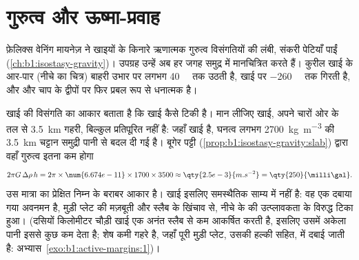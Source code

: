 \section{गुरुत्व और ऊष्मा-प्रवाह}\label{sec:b1:active-margins:gravity-heat}

फ़ेलिक्स वेनिंग मायनेज़ ने खाइयों के किनारे ऋणात्मक गुरुत्व विसंगतियों की लंबी, संकरी पेटियाँ पाईं (\cref{ch:b1:isostasy-gravity})। उपग्रह उन्हें अब हर जगह समुद्र में मानचित्रित करते हैं। कुरील खाई के आर-पार (नीचे का चित्र)  बाहरी उभार पर लगभग \qty{40}{\milli\gal} तक उठती है, खाई पर \qty{-260}{\milli\gal} तक गिरती है, और  और चाप के द्वीपों पर फिर प्रबल रूप से धनात्मक है।

खाई की विसंगति का आकार बताता है कि खाई कैसे टिकी है। मान लीजिए खाई, अपने चारों ओर के तल से \qty{3.5}{km} गहरी, बिल्कुल प्रतिपूरित नहीं है: जहाँ खाई है, घनत्व लगभग \qty{2700}{kg.m^{-3}} की \qty{3.5}{km} चट्टान समुद्री पानी से बदल दी गई है। बूगेर पट्टी (\cref{prop:b1:isostasy-gravity:slab}) द्वारा वहाँ गुरुत्व इतना कम होगा
\[
  2\pi G\,\Delta\rho\,h = 2\pi \times \num{6.674e-11} \times 1700 \times 3500
  \approx \qty{2.5e-3}{m.s^{-2}} = \qty{250}{\milli\gal} .
\]
उस मात्रा का प्रेक्षित निम्न के बराबर आकार है। खाई इसलिए समस्थैतिक साम्य में नहीं है: वह एक दबाया गया अवनमन है, मुड़ी प्लेट की मज़बूती और स्लैब के खिंचाव से, नीचे के  की उत्प्लावकता के विरुद्ध टिका हुआ। (दसियों किलोमीटर चौड़ी खाई एक अनंत स्लैब से कम आकर्षित करती है, इसलिए उसमें अकेला पानी इससे कुछ कम देता है; शेष कमी गहरे है, जहाँ पूरी मुड़ी प्लेट, उसकी हल्की  सहित,  में दबाई जाती है: अभ्यास~\ref{exo:b1:active-margins:1})।

